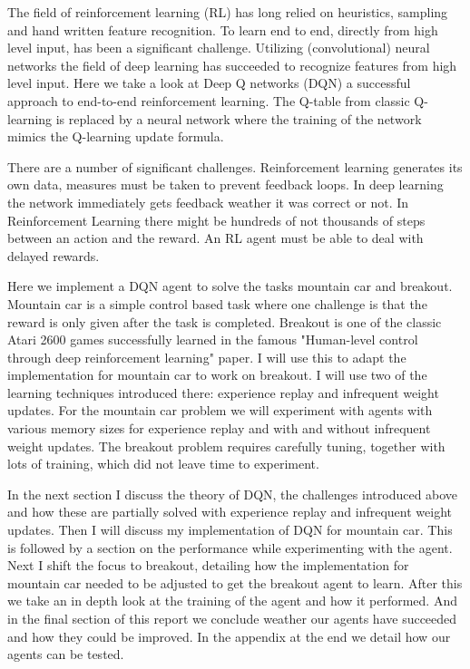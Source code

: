 The field of reinforcement learning (RL) has long relied on heuristics, sampling and hand written feature recognition. To learn end to end, directly from high level input, has been a significant challenge. Utilizing (convolutional) neural networks the field of deep learning has succeeded to recognize features from high level input. Here we take a look at Deep Q networks (DQN) a successful approach to end-to-end reinforcement learning. The Q-table from classic Q-learning is replaced by a neural network where the training of the network mimics the Q-learning update formula.

There are a number of significant challenges. Reinforcement learning generates its own data, measures must be taken to prevent feedback loops. In deep learning the network immediately gets feedback weather it was correct or not. In Reinforcement Learning there might be hundreds of not thousands of steps between an action and the reward. An RL agent must be able to deal with delayed rewards. 

Here we implement a DQN agent to solve the tasks mountain car and breakout. Mountain car is a simple control based task where one challenge is that the reward is only given after the task is completed. Breakout is one of the classic Atari 2600 games successfully learned in the famous "Human-level control through deep reinforcement learning"\cite{DQN} paper. I will use this to adapt the implementation for mountain car to work on breakout. I will use two of the learning techniques introduced there: experience replay and infrequent weight updates. For the mountain car problem we will experiment with agents with various memory sizes for experience replay and with and without infrequent weight updates. The breakout problem requires carefully tuning, together with lots of training, which did not leave time to experiment.

In the next section I discuss the theory of DQN, the challenges introduced above and how these are partially solved with experience replay and infrequent weight updates. Then I will discuss my implementation of DQN for mountain car. This is followed by a section on the performance while experimenting with the agent. Next I shift the focus to breakout, detailing how the implementation for mountain car needed to be adjusted to get the breakout agent to learn. After this we take an in depth look at the training of the agent and how it performed. And in the final section of this report we conclude weather our agents have succeeded and how they could be improved. In the appendix at the end we detail how our agents can be tested.